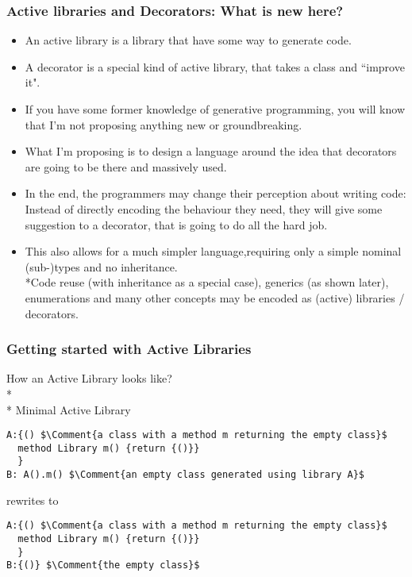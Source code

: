 \begin{frame}[fragile]
\frametitle{Active libraries and Decorators: What is new here?}
\begin{itemize}
\item An active library is a library that have some way to generate code.
\item A decorator is a special kind of active library, that takes a class and ``improve it".

\item If you have some former knowledge of generative programming, you will know that I'm not proposing anything new or groundbreaking.

\item What I'm proposing is to design a language around the idea that decorators are going to \alert{be there} and massively used.

\item In the end, the programmers may change their perception about writing code: Instead of directly encoding the behaviour they need, they will give some suggestion to a decorator, that is going to do all the hard job.

\item This also allows for a much simpler language,requiring only a simple nominal (sub-)types and no inheritance.
\\*Code reuse (with inheritance as a special case), generics (as shown later), enumerations and many other concepts may be encoded as (active) libraries / decorators.
\end{itemize}
\end{frame}


\begin{frame}[fragile]
\frametitle{Getting started with Active Libraries}
How an Active Library looks like? 
\\*${}_{}$
\\*
Minimal Active Library

\begin{NiceCode}{59ex}{1}
\begin{lstlisting}
A:{() $\Comment{a class with a method m returning the empty class}$
  method Library m() {return {()}}
  }
B: A().m() $\Comment{an empty class generated using library A}$
\end{lstlisting}
\end{NiceCode}
rewrites to 

\begin{NiceCode}{59ex}{1}
\begin{lstlisting}
A:{() $\Comment{a class with a method m returning the empty class}$
  method Library m() {return {()}}
  }
B:{()} $\Comment{the empty class}$
\end{lstlisting}
\end{NiceCode}

\end{frame}

